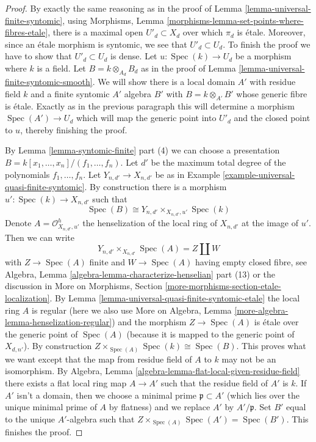 \documentclass{stacks-project}
\theoremstyle{plain}
\theoremstyle{definition}
\theoremstyle{remark}
\numberwithin{equation}{subsection}
\def\Spec{\mathop{\mathrm{Spec}}}
\begin{document}
\begin{proof}
By exactly the same reasoning as in the proof of
Lemma \ref{lemma-universal-finite-syntomic}, using
Morphisms, Lemma \ref{morphisms-lemma-set-points-where-fibres-etale},
there is a maximal open $U'_d \subset X_d$ over which $\pi_d$ is
\'etale. Moreover, since an \'etale morphism is syntomic, we see
that $U'_d \subset U_d$. To finish the proof we have to show
that $U'_d \subset U_d$ is dense. Let $u : \Spec(k) \to U_d$ be a morphism
where $k$ is a field. Let $B = k \otimes_{A_d} B_d$ as in the
proof of Lemma \ref{lemma-universal-finite-syntomic-smooth}.
We will show there is a local domain $A'$ with residue field $k$
and a finite syntomic $A'$ algebra $B'$ with $B = k \otimes_{A'} B'$
whose generic fibre is \'etale. Exactly as in the previous paragraph
this will determine a morphism $\Spec(A') \to U_d$ which will map the
generic point into $U'_d$ and the closed point to $u$, thereby
finishing the proof.

\medskip\noindent
By Lemma \ref{lemma-syntomic-finite} part (4) we can choose a presentation
$B = k[x_1, \ldots, x_n]/(f_1, \ldots, f_n)$.
Let $d'$ be the maximum total degree of the polynomials $f_1, \ldots, f_n$.
Let $Y_{n, d'} \to X_{n, d'}$ be as in
Example \ref{example-universal-quasi-finite-syntomic}.
By construction there is a morphism $u' : \Spec(k) \to X_{n, d'}$
such that
$$
\Spec(B) \cong Y_{n, d'} \times_{X_{n, d'}, u'} \Spec(k)
$$
Denote $A = \mathcal{O}_{X_{n, d'}, u'}^h$ the henselization of the
local ring of $X_{n, d'}$ at the image of $u'$. Then we can write
$$
Y_{n, d'} \times_{X_{n, d'}} \Spec(A) = Z \amalg W
$$
with $Z \to \Spec(A)$ finite and $W \to \Spec(A)$ having empty
closed fibre, see
Algebra, Lemma \ref{algebra-lemma-characterize-henselian} part (13)
or the discussion in More on Morphisms, Section
\ref{more-morphisms-section-etale-localization}.
By Lemma \ref{lemma-universal-quasi-finite-syntomic-etale}
the local ring $A$ is regular (here we also use
More on Algebra, Lemma \ref{more-algebra-lemma-henselization-regular})
and the morphism $Z \to \Spec(A)$ is \'etale over the generic point of
$\Spec(A)$ (because it is mapped to the generic point of $X_{d, n'}$).
By construction $Z \times_{\Spec(A)} \Spec(k) \cong \Spec(B)$.
This proves what we want except that the map from
residue field of $A$ to $k$ may not be an isomorphism.
By Algebra, Lemma \ref{algebra-lemma-flat-local-given-residue-field}
there exists a flat local ring map $A \to A'$ such that the residue
field of $A'$ is $k$. If $A'$ isn't a domain, then we choose a
minimal prime $\mathfrak p \subset A'$ (which lies over the
unique minimal prime of $A$ by flatness) and we replace
$A'$ by $A'/\mathfrak p$. Set $B'$ equal to the unique $A'$-algebra
such that $Z \times_{\Spec(A)} \Spec(A') = \Spec(B')$.
This finishes the proof.
\end{proof}
\end{document}
